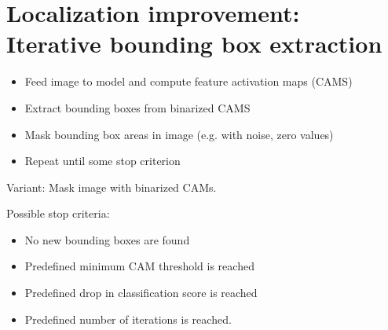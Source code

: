\section{Localization improvement: Iterative bounding box extraction}
\begin{itemize} 
    \item Feed image to model and compute feature activation maps (CAMS)
    \item Extract bounding boxes from binarized CAMS
    \item Mask bounding box areas in image (e.g. with noise, zero values) 
    \item Repeat until some stop criterion
\end{itemize}
Variant: Mask image with binarized CAMs.

Possible stop criteria: 
\begin{itemize}
    \item No new bounding boxes are found
    \item Predefined minimum CAM threshold is reached
    \item Predefined drop in classification score is reached
    \item Predefined number of iterations is reached.
\end{itemize}
